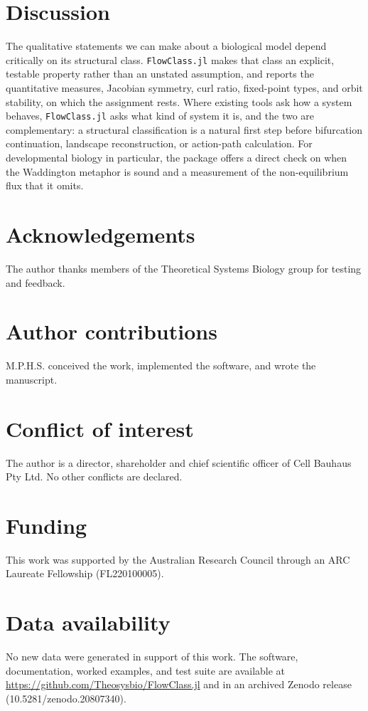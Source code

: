 \documentclass[unnumsec,webpdf,contemporary,large,namedate]{oup-authoring-template}
\begin{document}
\section{Discussion}

The qualitative statements we can make about a biological model depend
critically on its structural class. \texttt{FlowClass.jl} makes that class an
explicit, testable property rather than an unstated assumption, and reports the
quantitative measures, Jacobian symmetry, curl ratio, fixed-point types, and
orbit stability, on which the assignment rests. Where existing tools ask how a
system behaves, \texttt{FlowClass.jl} asks what kind of system it is, and the two
are complementary: a structural classification is a natural first step before
bifurcation continuation, landscape reconstruction, or action-path calculation.
For developmental biology in particular, the package offers a direct check on
when the Waddington metaphor is sound and a measurement of the non-equilibrium
flux that it omits.

\section*{Acknowledgements}

The author thanks members of the Theoretical Systems Biology group for testing
and feedback.

\section*{Author contributions}

M.P.H.S. conceived the work, implemented the software, and wrote the manuscript.

\section*{Conflict of interest}

The author is a director, shareholder and chief scientific officer  of Cell Bauhaus Pty Ltd. No other conflicts are
declared.

\section*{Funding}

This work was supported by the Australian Research Council through an ARC
Laureate Fellowship (FL220100005).

\section*{Data availability}

No new data were generated in support of this work. The software, documentation,
worked examples, and test suite are available at
\url{https://github.com/Theosysbio/FlowClass.jl} and in an archived Zenodo
release (10.5281/zenodo.20807340).



\end{document}
